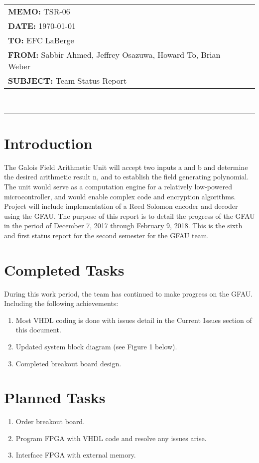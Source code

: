 \documentclass[paper=usletter, fontsize=12pt]{article}
\newcommand{\Sabbir}{Sabbir Ahmed}
\newcommand{\Jeffrey}{Jeffrey Osazuwa}
\newcommand{\Howard}{Howard To}
\newcommand{\Brian}{Brian Weber}
\newcommand{\documentinfo}[5]{
    \begin{centering}
        \parbox{6.8in}{
        \begin{spacing}{1}
            \begin{flushleft}
                \begin{tabular}{l l} #1 \\ #2 \\ #3 \\ #4 \\ #5 \\
                \end{tabular} \\
                \rule{\textwidth}{1pt}
            \end{flushleft}
        \end{spacing} }
    \end{centering} }
\begin{document}
    \documentinfo{\textbf{MEMO:} TSR-06}{\textbf{DATE: }{\today}}{\textbf{TO: }
    EFC LaBerge}{\textbf{FROM: }\Sabbir, \Jeffrey, \Howard,
    \Brian}{\textbf{SUBJECT: } Team Status Report}
    \vspace{-0.3in}

    \section{Introduction} The Galois Field Arithmetic Unit will accept two inputs
    a and b and determine the desired arithmetic result n, and to establish the field generating polynomial. The unit would serve as a computation engine for a relatively low-powered
    microcontroller, and would enable complex code and encryption algorithms.
    Project will include implementation of a Reed Solomon encoder and decoder
    using the GFAU. The purpose of this report is to detail the progress of the
    GFAU in the period of December 7, 2017 through February 9, 2018. This is
    the sixth and first status report for the second semester for the GFAU
    team.

    \section{Completed Tasks} During this work period, the team has continued
    to make progress on the GFAU. Including the following achievements:
    \begin{enumerate}[label=\alph*)]

        \item Most VHDL coding is done with issues detail in the Current Issues section of this document. 
        \item Updated system block diagram (see Figure 1 below). 
        \item Completed breakout board design. 
        
    \end{enumerate}

    \section{Planned Tasks}
   
    \begin{enumerate}[label=\alph*)]

        \item Order breakout board.
        \item Program FPGA with VHDL code and resolve any issues arise. 
        \item Interface FPGA with external memory.

    \end{enumerate}
\end{document}
